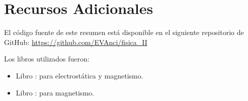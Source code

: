\documentclass[a4paper,12pt]{article}  %
\begin{document}
  \section*{Recursos Adicionales}
  El código fuente de este resumen está disponible en el siguiente repositorio de GitHub: \url{https://github.com/EVAnci/fisica_II}
  \vspace{5pt}

  Los libros utilizados fueron:
  \begin{itemize}
    \item Libro \cite{Serway}: para electrostática y magnetismo.
    \item Libro \cite{Sears_Zemansky}: para magnetismo.
  \end{itemize}
  \newpage
  \printbibliography
\end{document}
